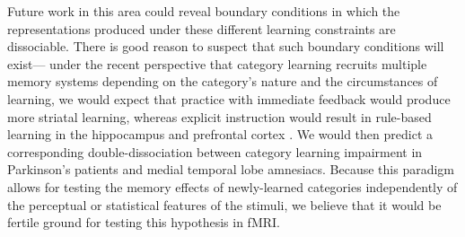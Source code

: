 \documentclass[twocolumn]{svjour3}          %
\begin{document}
Future work in this area could reveal boundary conditions in which the
representations produced under these different learning constraints
are dissociable. There is good reason to suspect that such boundary
conditions will exist--- under the recent perspective that category
learning recruits multiple memory systems depending on the category's
nature and the circumstances of learning, we would expect that
practice with immediate feedback would produce more striatal learning,
whereas explicit instruction would result in rule-based learning in
the hippocampus and prefrontal cortex \cite{Ashby2011}. We would then
predict a corresponding double-dissociation between category learning
impairment in Parkinson's patients and medial temporal lobe
amnesiacs. Because this paradigm allows for testing the memory effects
of newly-learned categories independently of the perceptual or
statistical features of the stimuli, we believe that it would be
fertile ground for testing this hypothesis in fMRI.

\begin{acknowledgements}
\end{acknowledgements}

 
\end{document}
